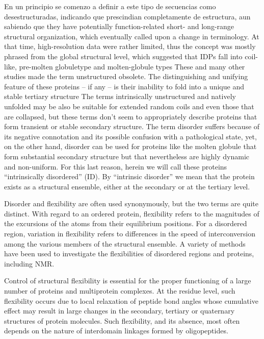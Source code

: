 En un principio se comenzo a definir a este tipo de secuencias como desestructuradas, indicando que prescindian completamente de estructura, aun sabiendo que they have potentially function-related
short- and long-range structural organization, which eventually called upon a change in terminology.
At that time, high-resolution data were rather limited, thus the concept was mostly phrased from the global structural level, which suggested that IDPs fall into coil-like, pre-molten globuletype and molten-globule types
These and many other studies made the term unstructured obsolete. 
The distinguishing and unifying feature of these proteins – if any – is their inability to fold into a unique and stable tertiary structure
The terms intrinsically unstructured and natively unfolded may be also be suitable for extended random coils and even those that are collapsed, but these terms don't seem to appropriately describe proteins that form transient or
stable secondary structure. The term disorder suffers because of its negative connotation and its possible confusion with a pathological state, yet, on the other hand, disorder can be used for proteins like the molten globule that form substantial secondary structure but that
nevertheless are highly dynamic and non-uniform. For this last reason, herein we will call these proteins “intrinsically disordered” (ID).
By “intrinsic disorder” we mean that the protein exists as a structural ensemble, either at the secondary or at the tertiary level.

Disorder and flexibility are often used synonymously, but the two terms are quite distinct\cite{radivojac2004protein}. With regard to an ordered protein, flexibility refers to the magnitudes of the excursions of the atoms from their equilibrium positions.
For a disordered region, variation in flexibility refers to differences in the speed of interconversion among the various members of the structural ensemble. 
A variety of methods have been used to investigate the flexibilities of disordered regions and proteins, including NMR.

Control of structural flexibility is essential for the proper functioning of a large number of proteins and multiprotein complexes. 
At the residue level, such flexibility occurs due to local relaxation of peptide bond angles whose cumulative effect may result in large changes in the secondary, tertiary or quaternary structures of protein molecules. 
Such flexibility, and its absence, most often depends on the nature of interdomain linkages formed by oligopeptides.

